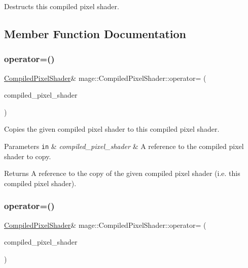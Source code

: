 Destructs this compiled pixel shader. 

\subsection{Member Function Documentation}
\hypertarget{structmage_1_1_compiled_pixel_shader_a0dde38701c2e15a52d5d80f992a32551}{}\label{structmage_1_1_compiled_pixel_shader_a0dde38701c2e15a52d5d80f992a32551} 
\subsubsection{\texorpdfstring{operator=()}{operator=()}\hspace{0.1cm}{\footnotesize\ttfamily [1/2]}}
{\footnotesize\ttfamily \hyperlink{structmage_1_1_compiled_pixel_shader}{Compiled\+Pixel\+Shader}\& mage\+::\+Compiled\+Pixel\+Shader\+::operator= (\begin{DoxyParamCaption}\item[{const \hyperlink{structmage_1_1_compiled_pixel_shader}{Compiled\+Pixel\+Shader} \&}]{compiled\+\_\+pixel\+\_\+shader }\end{DoxyParamCaption})\hspace{0.3cm}{\ttfamily [delete]}}

Copies the given compiled pixel shader to this compiled pixel shader.


\begin{DoxyParams}[1]{Parameters}
\mbox{\tt in}  & {\em compiled\+\_\+pixel\+\_\+shader} & A reference to the compiled pixel shader to copy. \\
\hline
\end{DoxyParams}
\begin{DoxyReturn}{Returns}
A reference to the copy of the given compiled pixel shader (i.\+e. this compiled pixel shader). 
\end{DoxyReturn}
\hypertarget{structmage_1_1_compiled_pixel_shader_a347557ae3d91dd0d561c56bc2c811a2f}{}\label{structmage_1_1_compiled_pixel_shader_a347557ae3d91dd0d561c56bc2c811a2f} 
\subsubsection{\texorpdfstring{operator=()}{operator=()}\hspace{0.1cm}{\footnotesize\ttfamily [2/2]}}
{\footnotesize\ttfamily \hyperlink{structmage_1_1_compiled_pixel_shader}{Compiled\+Pixel\+Shader}\& mage\+::\+Compiled\+Pixel\+Shader\+::operator= (\begin{DoxyParamCaption}\item[{\hyperlink{structmage_1_1_compiled_pixel_shader}{Compiled\+Pixel\+Shader} \&\&}]{compiled\+\_\+pixel\+\_\+shader }\end{DoxyParamCaption})\hspace{0.3cm}{\ttfamily [delete]}}

